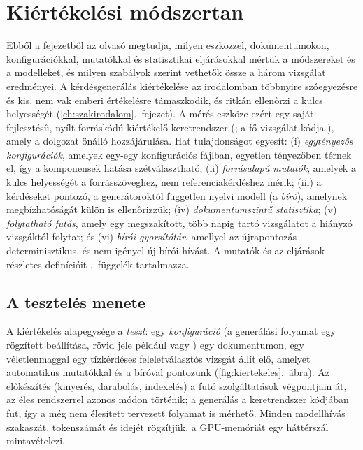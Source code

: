 \chapter{Kiértékelési módszertan}
\label{ch:kiertekeles}

Ebből a fejezetből az olvasó megtudja, milyen eszközzel, dokumentumokon, konfigurációkkal, mutatókkal és
statisztikai eljárásokkal mértük a módszereket és a modelleket, és milyen szabályok szerint vethetők össze
a három vizsgálat eredményei. A kérdésgenerálás kiértékelése az irodalomban többnyire szóegyezésre és kis,
nem vak emberi értékelésre támaszkodik, és ritkán ellenőrzi a kulcs helyességét
(\ref{ch:szakirodalom}.~fejezet). A mérés eszköze ezért egy saját fejlesztésű, nyílt forráskódú kiértékelő
keretrendszer (; a fő vizsgálat kódja ), amely a dolgozat önálló
hozzájárulása. Hat tulajdonságot egyesít: (i) \emph{egytényezős konfigurációk}, amelyek egy-egy
konfigurációs fájlban, egyetlen tényezőben térnek el, így a komponensek hatása szétválasztható;
(ii) \emph{forrásalapú mutatók}, amelyek a kulcs helyességét a forrásszöveghez, nem referenciakérdéshez
mérik; (iii) a kérdéseket pontozó, a generátoroktól független nyelvi modell (a \emph{bíró}), amelynek
megbízhatóságát külön is ellenőrizzük; (iv) \emph{dokumentumszintű statisztika}; (v) \emph{folytatható
futás}, amely egy megszakított, több napig tartó vizsgálatot a hiányzó vizsgáktól folytat; és
(vi) \emph{bírói gyorsítótár}, amellyel az újrapontozás determinisztikus, és nem igényel új bírói hívást.
A mutatók és az eljárások részletes definícióit \az{\ref{app-modszer}}.~függelék tartalmazza.

\section{A tesztelés menete}
\label{sec:harness}

A kiértékelés alapegysége a \emph{teszt}: egy \emph{konfiguráció} (a generálási folyamat egy rögzített
beállítása, rövid jele például  vagy ) egy dokumentumon, egy véletlenmaggal egy
tízkérdéses feleletválasztós vizsgát állít elő, amelyet automatikus mutatókkal és a bíróval pontozunk
(\ref{fig:kiertekeles}.~ábra). Az előkészítés (kinyerés, darabolás, indexelés) a futó szolgáltatások
végpontjain át, az éles rendszerrel azonos módon történik; a generálás a keretrendszer kódjában fut, így a
még nem élesített tervezett folyamat is mérhető. Minden modellhívás szakaszát, tokenszámát és idejét
rögzítjük, a GPU-memóriát egy háttérszál mintavételezi.

